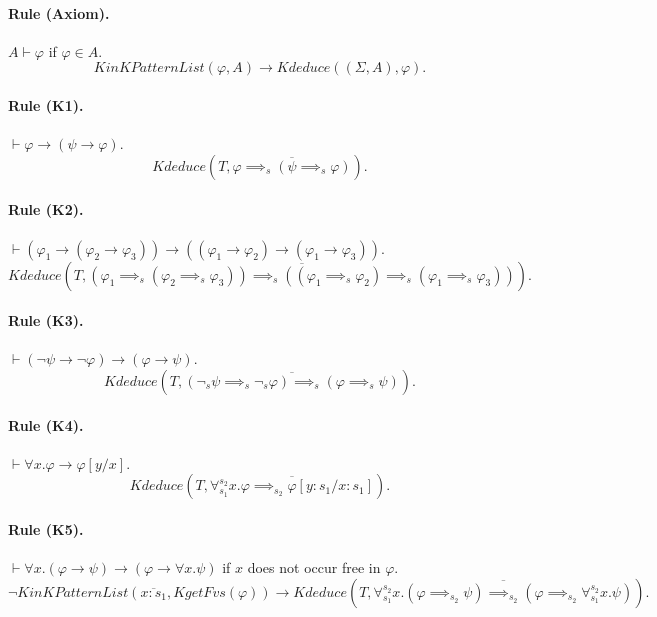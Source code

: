 \documentclass[UTF8,11pt]{article}
\theoremstyle{plain}
\theoremstyle{definition}
\theoremstyle{remark}
\newcommand{\cln}{{:}}
\newcommand{\KinKPatternList}{\mathit{KinKPatternList}}
\newcommand{\KgetFvs}{\mathit{KgetFvs}}
\newcommand{\Kdeduce}{\mathit{Kdeduce}}
\begin{document}
\paragraph{Rule (Axiom).}
$A \vdash \varphi$ if $\varphi \in A$.
\begin{equation*}
\KinKPatternList(\varphi, A) \to \Kdeduce(( \Sigma, A ), \varphi).
\end{equation*}

\paragraph{Rule (K1).}
$\vdash \varphi \to (\psi \to \varphi)$.
\begin{equation*}
\Kdeduce(T, \overline{\varphi \implies_s (\psi \implies_s \varphi)}).
\end{equation*}

\paragraph{Rule (K2).}
$\vdash (\varphi_1 \to (\varphi_2 \to \varphi_3)) \to ((\varphi_1 \to \varphi_2) \to (\varphi_1 \to \varphi_3))$.
\begin{equation*}
\Kdeduce(T, 
\overline{(\varphi_1 \implies_s (\varphi_2 \implies_s \varphi_3)) \implies_s ((\varphi_1 \implies_s \varphi_2) \implies_s (\varphi_1 \implies_s \varphi_3))}).
\end{equation*}

\paragraph{Rule (K3).}
$\vdash (\neg \psi \to \neg \varphi) \to (\varphi \to \psi)$.
\begin{equation*}
\Kdeduce(T, \overline{(\neg_s \psi \implies_s \neg_s \varphi) \implies_s (\varphi 
\implies_s \psi)}).
\end{equation*}

\paragraph{Rule (K4).}
$\vdash \forall x . \varphi \to \varphi[y/x]$.
\begin{equation*}
\Kdeduce(T, \overline{\forall_{s_1}^{s_2}  x . \varphi \implies_{s_2} \varphi[y \cln s_1 / x \cln s_1]}).
\end{equation*}

\paragraph{Rule (K5).}
$\vdash \forall x . (\varphi \to \psi) \to (\varphi \to \forall x . \psi)$ if $x$ does not occur free in $\varphi$. 
\begin{equation*}
\neg\KinKPatternList(\overline{x \cln s_1}, \KgetFvs(\varphi))
\to \Kdeduce(T, \overline{\forall_{s_1}^{s_2} x . (\varphi \implies_{s_2} \psi) \implies_{s_2} (\varphi \implies_{s_2} \forall_{s_1}^{s_2} x . \psi)}).
\end{equation*}
\end{document}
